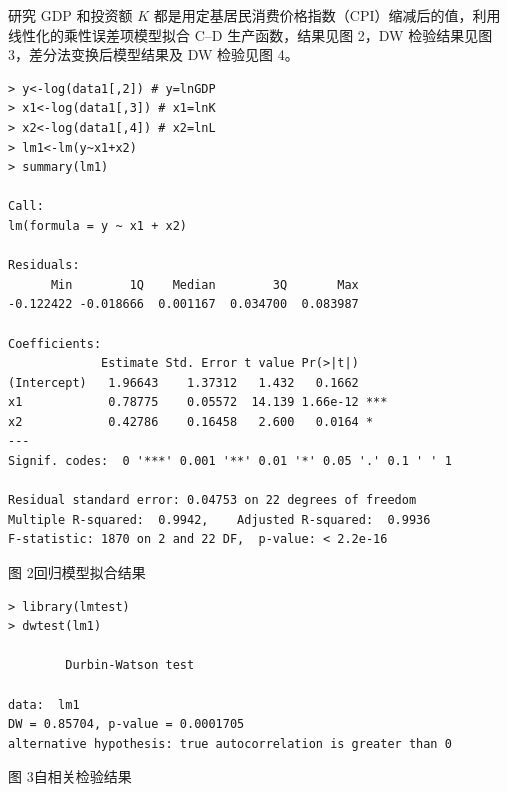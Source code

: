 \documentclass[UTF8,fontset=fandol,zihao=-4,a4paper]{ctexart}
\newcommand{\examsection}[2]{%
  \vspace{0.2em}\noindent{\heiti\bfseries #1（#2）}\par\vspace{0.45em}}
\newcommand{\answerarea}[1]{\par\vspace{#1}}
\begin{document}
\answerarea{9cm}

\examsection{六、综合分析题}{10 分}

研究 GDP 和投资额 $K$ 都是用定基居民消费价格指数（CPI）缩减后的值，利用线性化的乘性误差项模型拟合 C--D 生产函数，结果见图 2，DW 检验结果见图 3，差分法变换后模型结果及 DW 检验见图 4。

\newpage

{\fontsize{8.2pt}{9.2pt}\selectfont
\begin{Verbatim}
> y<-log(data1[,2]) # y=lnGDP
> x1<-log(data1[,3]) # x1=lnK
> x2<-log(data1[,4]) # x2=lnL
> lm1<-lm(y~x1+x2)
> summary(lm1)

Call:
lm(formula = y ~ x1 + x2)

Residuals:
      Min        1Q    Median        3Q       Max
-0.122422 -0.018666  0.001167  0.034700  0.083987

Coefficients:
             Estimate Std. Error t value Pr(>|t|)
(Intercept)   1.96643    1.37312   1.432   0.1662
x1            0.78775    0.05572  14.139 1.66e-12 ***
x2            0.42786    0.16458   2.600   0.0164 *
---
Signif. codes:  0 '***' 0.001 '**' 0.01 '*' 0.05 '.' 0.1 ' ' 1

Residual standard error: 0.04753 on 22 degrees of freedom
Multiple R-squared:  0.9942,    Adjusted R-squared:  0.9936
F-statistic: 1870 on 2 and 22 DF,  p-value: < 2.2e-16
\end{Verbatim}
\begin{center}
图 2\quad 回归模型拟合结果
\end{center}

\begin{Verbatim}
> library(lmtest)
> dwtest(lm1)

        Durbin-Watson test

data:  lm1
DW = 0.85704, p-value = 0.0001705
alternative hypothesis: true autocorrelation is greater than 0
\end{Verbatim}
\begin{center}
图 3\quad 自相关检验结果
\end{center}
}

\newpage
\end{document}
